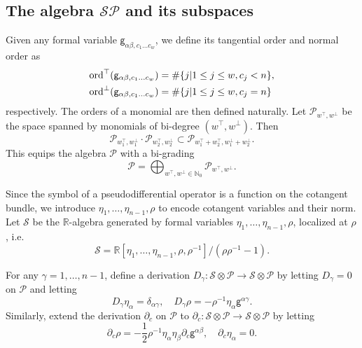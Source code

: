 \documentclass[11pt]{amsart}
\newcommand{\ord}{\operatorname{ord}}
\theoremstyle{definition}
\numberwithin{equation}{section}
\begin{document}
\subsection{The algebra $\mathcal{SP}$ and its subspaces}
Given any formal variable $\mathsf g_{\alpha\beta,c_1\dots c_w}$, we define its tangential order and normal order as 
\[\aligned 
\ord^\top(\mathsf g_{\alpha\beta,c_1\dots c_w})& =\#\{j|1\le j\le w,c_j<n\},
\\
\ord^\bot(\mathsf g_{\alpha\beta,c_1\dots c_w})&=\#\{j|1\le j\le w,c_j=n\}
\endaligned\]
respectively. The orders of a monomial are then defined naturally. Let $\mathcal P_{w^\top,w^\bot}$ be the space spanned by monomials of bi-degree $(w^\top,w^\bot)$. Then 
\[  \mathcal P_{w_1^\top,w_1^\bot}\cdot\mathcal P_{w_2^\top,w_2^\bot}\subset \mathcal P_{w_1^\top + w_2^\top,w_1^\bot + w_2^\bot}.\]
This equips the algebra $\mathcal P$ with a bi-grading  
\[\mathcal P = \bigoplus_{w^\top,w^\bot\in\mathbb N_0}\mathcal P_{w^\top,w^\bot}.\]



Since the symbol of a pseudodifferential operator is a function on the cotangent bundle, we introduce 
$\eta_1,\dots,\eta_{n-1},\rho$
to encode cotangent variables and their norm. Let $\mathcal S$ be the $\mathbb R$-algebra generated by formal variables $\eta_1,\dots,\eta_{n-1},\rho$, localized at $\rho$, i.e.
\[\mathcal S = \mathbb R[\eta_1,\dots,\eta_{n-1},\rho,\rho^{-1}]/(\rho\rho^{-1}-1).\]

For any $\gamma=1,\dots,n-1$, define a derivation  $D_\gamma: \mathcal S\otimes\mathcal P \to \mathcal S\otimes\mathcal P$ by  letting  $D_\gamma=0$ on $\mathcal P$ and letting 
\[D_\gamma\eta_\alpha = \delta_{\alpha\gamma},\quad D_\gamma\rho = -\rho^{-1}\eta_\alpha\mathsf g^{\alpha\gamma}.\] 
Similarly,   extend the derivation $\partial_c$ on $\mathcal P$ to  $\partial_c: \mathcal S\otimes\mathcal P \to \mathcal S\otimes\mathcal P$ by  letting 
\[\partial_c\rho = -\frac{1}{2}\rho^{-1}\eta_{\alpha}\eta_{\beta} \partial_c\mathsf g^{\alpha\beta},\quad \partial_c \eta_\alpha = 0.\] 
\end{document}
